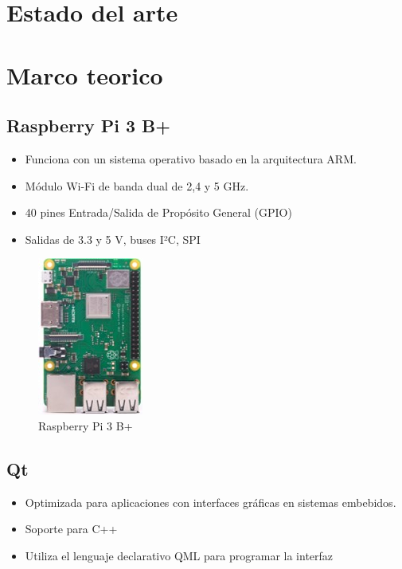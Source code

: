 \documentclass[12pt]{report}
\begin{document}
\newpage
\section*{Estado del arte}

\newpage
\section*{Marco teorico}

\subsection*{Raspberry Pi 3 B+}
\begin{itemize}

	\item Funciona con un sistema operativo basado en la arquitectura ARM.
	
	\item Módulo Wi-Fi de banda dual de 2,4 y 5 GHz.
	
	\item 40 pines Entrada/Salida de Propósito General (GPIO)
	
	\item Salidas de 3.3 y 5 V, buses I²C, SPI
	
\end{itemize}

\begin{figure}[htb]
	\centering
	\includegraphics[scale=0.5]{raspberrypi.jpg}
	\caption{Raspberry Pi 3 B+}
\end{figure}

\subsection*{Qt}
\begin{itemize}
	
	\item Optimizada para aplicaciones con interfaces gráficas en sistemas embebidos.
	
	\item Soporte para C++
	
	\item Utiliza el lenguaje declarativo QML para programar la interfaz
	
\end{itemize}
\end{document}

